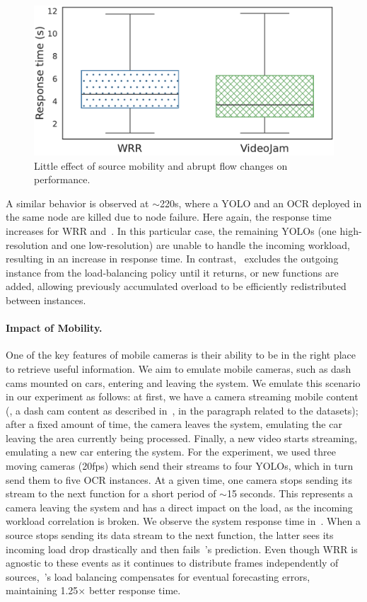 \begin{figure}[t!]
	\centering
	\includegraphics[width=.6\linewidth]{chapters/videojam/images/impact_of_mobility/response_time.pdf}
	\caption{Little effect of source mobility and abrupt flow changes on~\videojam{} performance.}
	\label{fig:impact_mobility}
\end{figure}

A similar behavior is observed at $\sim$220s, where a YOLO and an OCR deployed in the same node are killed due to node failure. Here again, the response time increases for WRR and~\videojam{}. In this particular case, the remaining YOLOs (one high-resolution and one low-resolution) are unable to handle the incoming workload, resulting in an increase in response time. In contrast,~\videojam{} excludes the outgoing instance from the load-balancing policy until it returns, or new functions are added, allowing previously accumulated overload to be efficiently redistributed between instances.


\paragraph{Impact of Mobility.} One of the key features of mobile cameras is their ability to be in the right place to retrieve useful information. We aim to emulate mobile cameras, such as dash cams mounted on cars, entering and leaving the system. We emulate this scenario in our experiment as follows: at first, we have a camera streaming mobile content (\ie, a dash cam content as described in~, in the paragraph related to the datasets); after a fixed amount of time, the camera leaves the system, emulating the car leaving the area currently being processed. Finally, a new video starts streaming, emulating a new car entering the system. For the experiment, we used three moving cameras (20fps) which send their streams to four YOLOs, which in turn send them to five OCR instances. At a given time, one camera stops sending its stream to the next function for a short period of $\sim$15 seconds. This represents a camera leaving the system and has a direct impact on the load, as the incoming workload correlation is broken. We observe the system response time in~. When a source stops sending its data stream to the next function, the latter sees its incoming load drop drastically and then fails~\videojam{}'s prediction. Even though WRR is agnostic to these events as it continues to distribute frames independently of sources,~\videojam{}'s load balancing compensates for eventual forecasting errors, maintaining 1.25$\times$ better response time.